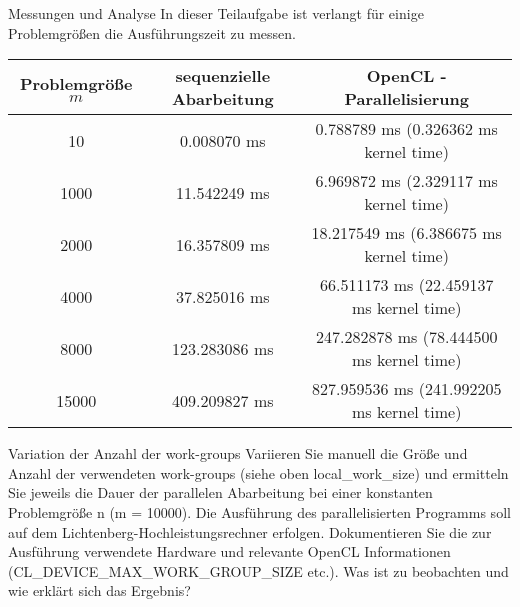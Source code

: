 \documentclass[
ngerman,
subtask=ruled %
]{tudaexercise}
\begin{document}
	\begin{task}{Messungen und Analyse} 
		In dieser Teilaufgabe ist verlangt für einige Problemgrößen die Ausführungszeit zu messen.
		
		\begin{tabular}{|c|c|c|}
			\hline
			Problemgröße $m$ & sequenzielle Abarbeitung & OpenCL - Parallelisierung \\
			\hline
			10 & 0.008070 ms & 0.788789 ms (0.326362 ms kernel time) \\
			\hline
			1000 & 11.542249 ms & 6.969872 ms (2.329117 ms kernel time) \\
			\hline
			2000 & 16.357809 ms & 18.217549 ms (6.386675 ms kernel time) \\
			\hline
			4000 & 37.825016 ms & 66.511173 ms (22.459137 ms kernel time) \\
			\hline
			8000 & 123.283086 ms & 247.282878 ms (78.444500 ms kernel time) \\
			\hline
			15000 & 409.209827 ms & 827.959536 ms (241.992205 ms kernel time) \\
			\hline
		\end{tabular}
	\end{task}

	\begin{task} {Variation der Anzahl der work-groups}
		Variieren Sie manuell die Größe und Anzahl der verwendeten work-groups (siehe oben local\_work\_size) und ermitteln
		Sie jeweils die Dauer der parallelen Abarbeitung bei einer konstanten Problemgröße n (m = 10000). Die Ausführung
		des parallelisierten Programms soll auf dem Lichtenberg-Hochleistungsrechner erfolgen. Dokumentieren Sie die zur
		Ausführung verwendete Hardware und relevante OpenCL Informationen (CL\_DEVICE\_MAX\_WORK\_GROUP\_SIZE etc.).
		Was ist zu beobachten und wie erklärt sich das Ergebnis?
	\end{task}

	
\end{document}
